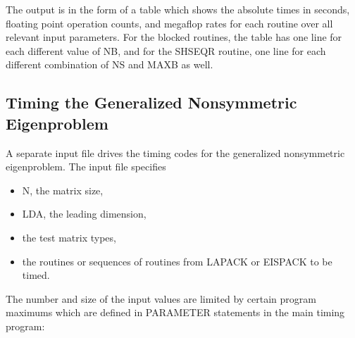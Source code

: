 The output is in the form of a table which shows
the absolute times in seconds,
floating point operation counts,
and megaflop rates for each routine
over all relevant input parameters.
For the blocked routines, the table has one line
for each different value of NB,
and for the SHSEQR routine, one line for
each different combination of NS and MAXB as well. 

\subsection{Timing the Generalized Nonsymmetric Eigenproblem}

\dent
A separate input file drives the timing codes for the
generalized nonsymmetric eigenproblem.
The input file specifies
\begin{itemize}
\item N, the matrix size,
\item LDA, the leading dimension,
\item the test matrix types,
\item the routines or sequences of routines from
LAPACK or EISPACK to be timed.
\end{itemize}

The number and size of the input values are limited by certain program
maximums which are defined in PARAMETER statements in the
main timing program:


